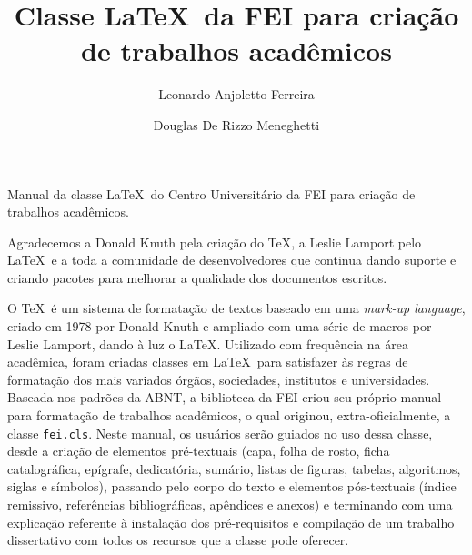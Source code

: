 \documentclass[xindy,rascunho]{fei}
\author{Leonardo Anjoletto Ferreira \and Douglas De Rizzo Meneghetti}
\title{Classe \LaTeX\ da FEI para criação de trabalhos acadêmicos}
\begin{document}

\maketitle

\begin{folhaderosto}
Manual da classe \LaTeX\ do Centro Universitário da FEI para criação de trabalhos acadêmicos.
\end{folhaderosto}

\fichacatalografica
\folhadeaprovacao
{}
\begin{agradecimentos}
Agradecemos a Donald Knuth pela criação do \TeX, a Leslie Lamport pelo \LaTeX\ e a toda a comunidade de desenvolvedores que continua dando suporte e criando pacotes para melhorar a qualidade dos documentos escritos.
\end{agradecimentos}

\begin{resumo}
O \TeX\ é um sistema de formatação de textos baseado em uma \emph{mark-up language}, criado em 1978 por Donald Knuth e ampliado com uma série de macros por Leslie Lamport, dando à luz o \LaTeX. Utilizado com frequência na área acadêmica, foram criadas classes em \LaTeX\ para satisfazer às regras de formatação dos mais variados órgãos, sociedades, institutos e universidades. Baseada nos padrões da ABNT, a biblioteca da FEI criou seu próprio manual para formatação de trabalhos acadêmicos, o qual originou, extra-oficialmente, a classe \texttt{fei.cls}. Neste manual, os usuários serão guiados no uso dessa classe, desde a criação de elementos pré-textuais (capa, folha de rosto, ficha catalográfica, epígrafe, dedicatória, sumário, listas de figuras, tabelas, algoritmos, siglas e símbolos), passando pelo corpo do texto e elementos pós-textuais (índice remissivo, referências bibliográficas, apêndices e anexos) e terminando com uma explicação referente à instalação dos pré-requisitos e compilação de um trabalho dissertativo com todos os recursos que a classe pode oferecer.
\end{resumo}
\end{document}
